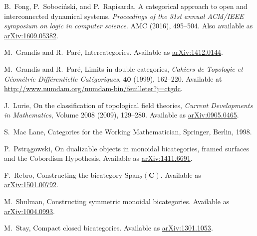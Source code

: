 \documentclass[11pt]{amsart}
\newcommand{\cat}[1]{\mathbf{#1}}
\theoremstyle{remark}
\theoremstyle{definition}
\begin{document}
\begin{thebibliography}{100}
B.~Fong, P.~Soboci\'{n}ski, and P.~Rapisarda,
A categorical approach to open and interconnected dynamical systems.
\emph{Proceedings of the 31st annual ACM/IEEE symposium on logic in computer science}.
AMC (2016), 495--504.
Also available as \href{https://arxiv.org/abs/1609.05382}{arXiv:1609.05382}.

M.~Grandis and R.~Par\'{e}, 
Intercategories.
Available as \href{https://arxiv.org/abs/1412.0144}{arXiv:1412.0144}.

M.~Grandis and R.~Par\'{e}, 
Limits in double categories, 
\emph{Cahiers de Topologie et G\'{e}om\'{e}trie Diff\'{e}rentielle Cat\'{e}goriques}, $\mathbf{40}$  
(1999), 162--220. 
Available at \href{http://www.numdam.org/numdam-bin/feuilleter?j=ctgdc}{http://www.numdam.org/numdam-bin/feuilleter?j=ctgdc}.

J.~Lurie,
On the classification of topological field theories,
\emph{Current Developments in Mathematics},
Volume 2008 (2009), 129--280.
Available as \href{https://arxiv.org/abs/0905.0465}{arXiv:0905.0465}.

S.~Mac Lane, 
Categories for the Working Mathematician,
Springer, Berlin, 1998.

P.~Pstrągowski,
On dualizable objects in monoidal bicategories, framed surfaces and the Cobordism Hypothesis, 
Available as \href{https://arxiv.org/abs/1411.6691}{arXiv:1411.6691}.

F.~Rebro, 
Constructing the bicategory Span$_{2}(\cat{C})$. 
Available as \href{https://arxiv.org/abs/1501.00792}{arXiv:1501.00792}.

M.~Shulman, 
Constructing symmetric monoidal bicategories. 
Available as \href{http://arxiv.org/abs/1004.0993}{arXiv:1004.0993}.

 M.~Stay, 
Compact closed bicategories. 
Available as \href{http://arxiv.org/abs/1301.1053}{arXiv:1301.1053}.

\end{thebibliography}


%
%
\end{document}
